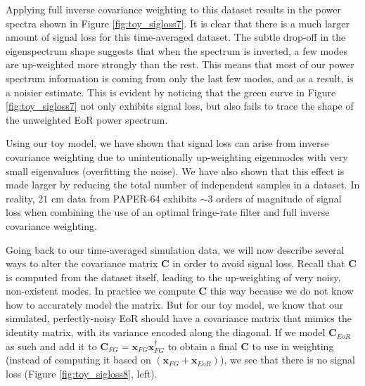 \documentclass[preprint2,numberedappendix,tighten,twocolappendix]{aastex6}  %
\begin{document}
Applying full inverse covariance weighting to this dataset results in the power spectra shown in Figure \ref{fig:toy_sigloss7}. It is clear that there is a much larger amount of signal loss for this time-averaged dataset. The subtle drop-off in the eigenspectrum shape suggests that when the spectrum is inverted, a few modes are up-weighted more strongly than the rest. This means that most of our power spectrum information is coming from only the last few modes, and as a result, is a noisier estimate. This is evident by noticing that the green curve in Figure \ref{fig:toy_sigloss7} not only exhibits signal loss, but also fails to trace the shape of the unweighted EoR power spectrum.

Using our toy model, we have shown that signal loss can arise from inverse covariance weighting due to unintentionally up-weighting eigenmodes with very small eigenvalues (overfitting the noise). We have also shown that this effect is made larger by reducing the total number of independent samples in a dataset. In reality, $21$ cm data from PAPER-64 exhibits $\sim3$ orders of magnitude of signal loss when combining the use of an optimal fringe-rate filter and full inverse covariance weighting. 

Going back to our time-averaged simulation data, we will now describe several ways to alter the covariance matrix $\textbf{C}$ in order to avoid signal loss. Recall that $\textbf{C}$ is computed from the dataset itself, leading to the up-weighting of very noisy, non-existent modes. In practice we compute $\textbf{C}$ this way because we do not know how to accurately model the matrix. But for our toy model, we know that our simulated, perfectly-noisy EoR should have a covariance matrix that mimics the identity matrix, with its variance encoded along the diagonal. If we model $\textbf{C}_{EoR}$ as such and add it to $\textbf{C}_{FG} = \textbf{x}_{FG}\textbf{x}_{FG}^{\dagger}$ to obtain a final $\textbf{C}$ to use in weighting (instead of computing it based on $(\textbf{x}_{FG} + \textbf{x}_{EoR})$), we see that there is no signal loss (Figure \ref{fig:toy_sigloss8}, left).
\end{document}
